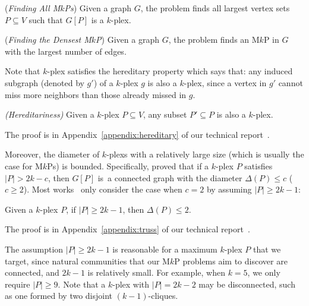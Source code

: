 \documentclass[sigconf, nonacm]{acmart}
\begin{document}
\vspace{-1mm}
\begin{definition}(\emph{Finding All M$k$Ps})\label{def:all-MkP} %
  Given a graph $G$, the problem finds all largest vertex sets $P\subseteq V$ such that $G[P]$ is a $k$-plex. 
\end{definition}

\vspace{-2mm}
\begin{definition}(\emph{Finding the Densest M$k$P})\label{def:densest-MkP} %
  Given a graph $G$, the problem finds an M$k$P in $G$ with the largest number of edges.
\end{definition}
\vspace{-1mm}

\vspace{1mm}
Note that $k$-plex satisfies the hereditary property which says that: any induced subgraph (denoted by $g'$) of a $k$-plex $g$ is also a $k$-plex, since a vertex in $g'$ cannot miss more neighbors than those already missed in $g$.
\vspace{-1mm}
\begin{theorem}\emph{(Hereditariness)}
\label{theorem:hereditary}
   Given a $k$-plex $P\subseteq V$, any subset $P'\subseteq P$ is also a $k$-plex.
\end{theorem}
\vspace{-1mm}
The proof is in Appendix~\ref{appendix:hereditary} of our technical report~\cite{tech_report}.
\vspace{1mm}

Moreover, the diameter of $k$-plexs with a relatively large size (which is usually the case for M$k$Ps) is bounded. Specifically, \cite{BS} proved that if a $k$-plex $P$ satisfies $|P|>2k-c$, then $G[P]$ is~a connected graph with the diameter $\Delta(P)\leq c$ ($c\geq 2$). Most works~\cite{kPlexS,Maple} only consider the case when $c=2$ by assuming $|P|\geq 2k-1$:
\begin{theorem}
\label{lemma::diameter}
    Given a $k$-plex $P$, if  $|P|\geq 2k-1$, then $\Delta(P)\leq 2$.
\end{theorem}
The proof is in Appendix~\ref{appendix:truss} of our technical report~\cite{tech_report}.
\vspace{1mm}

The assumption $|P|\geq 2k-1$ is reasonable for a maximum $k$-plex $P$ that we target, since natural communities that our M$k$P problems aim to discover are connected, and $2k-1$ is relatively small. For example, when $k=5$, we only require $|P|\geq 9$. Note that a $k$-plex with $|P|=2k-2$ may be disconnected, such as one formed by two disjoint $(k-1)$-cliques.
\end{document}
